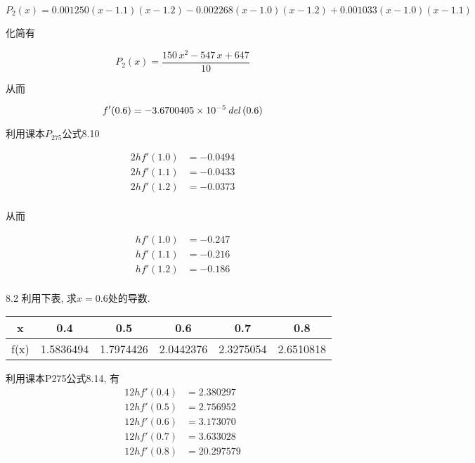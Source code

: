 \documentclass[a4paper, 10pt]{article}
\begin{document}
\begin{CJK}{UTF8}{gbsn}
\begin{equation*}
	P_2(x) = 0.001250(x-1.1)(x-1.2) - 0.002268(x-1.0)(x-1.2) + 0.001033(x-1.0)(x-1.1)
\end{equation*}

化简有

\begin{equation}
	P_2(x) = \frac{150\,x^2-547\,x+647}{10}
\end{equation}

从而

\begin{equation}
	f'(0.6) = -3.6700405 \times 10^{-5}\,{\it del}\left(0.6\right)
\end{equation}

利用课本$P_{275}$公式8.10

\begin{align*}
	2hf'(1.0) & = -0.0494 \\
	2hf'(1.1) & = -0.0433 \\
	2hf'(1.2) & = -0.0373 \\
\end{align*}

从而

\begin{align*}
	hf'(1.0) & = -0.247 \\
	hf'(1.1) & = -0.216 \\
	hf'(1.2) & = -0.186 \\
\end{align*}

8.2
利用下表, 求$x=0.6$处的导数.\\

\begin{tabular}{c| c c c c c}
\hline
x    & 0.4       & 0.5       & 0.6       & 0.7       & 0.8 \\
\hline
f(x) & 1.5836494 & 1.7974426 & 2.0442376 & 2.3275054 & 2.6510818 \\
\hline
\end{tabular}

利用课本P275公式8.14, 有 \\

\begin{align*}
	12hf'(0.4) & =  2.380297 \\
	12hf'(0.5) & =  2.756952 \\
	12hf'(0.6) & =  3.173070 \\
	12hf'(0.7) & =  3.633028 \\
	12hf'(0.8) & = 20.297579 \\
\end{align*}


\end{CJK}
\end{document}

